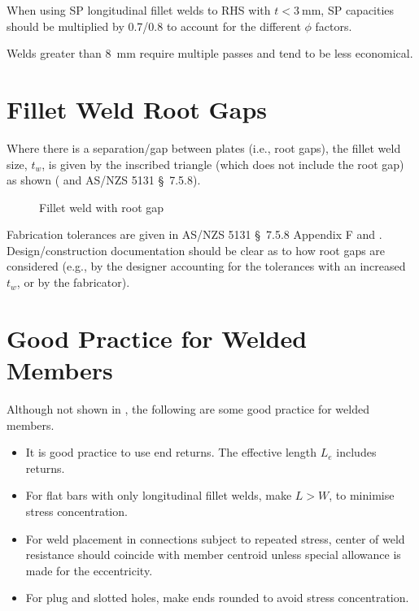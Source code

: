 When using SP longitudinal fillet welds to RHS with $t<\SI{3}{\mm}$, SP capacities should be multiplied by \num{0.7}/\num{0.8} to account for the different $\phi$ factors.

Welds greater than \SI{8}{\mm} require multiple passes and tend to be less economical.
\section{Fillet Weld Root Gaps}
Where there is a separation/gap between plates (i.e., root gaps), the fillet weld size, $t_w$, is given by the inscribed triangle (which does not include the root gap) as shown ( and AS/NZS 5131 \S~7.5.8).
\begin{figure}[H]
\centering
\caption{Fillet weld with root gap}
\end{figure}

Fabrication tolerances are given in AS/NZS 5131 \S~7.5.8 Appendix F and . Design/construction documentation should be clear as to how root gaps are considered (e.g., by the designer accounting for the tolerances with an increased $t_w$, or by the fabricator).
\section{Good Practice for Welded Members}
Although not shown in \NZSSTEEL{}, the following are some good practice for welded members.
\begin{itemize}
\item It is good practice to use end returns. The effective length $L_e$ includes returns.
\begin{figure}[H]
\centering
\end{figure}
\item For flat bars with only longitudinal fillet welds, make $L>W$, to minimise stress concentration.
\begin{figure}[H]
\centering
\end{figure}
\item For weld placement in connections subject to repeated stress, center of weld resistance should coincide with member centroid unless special allowance is made for the eccentricity.
\begin{figure}[H]
\centering
\end{figure}
\item For plug and slotted holes, make ends rounded to avoid stress concentration.
\begin{figure}[H]
\centering
\end{figure}
\end{itemize}
